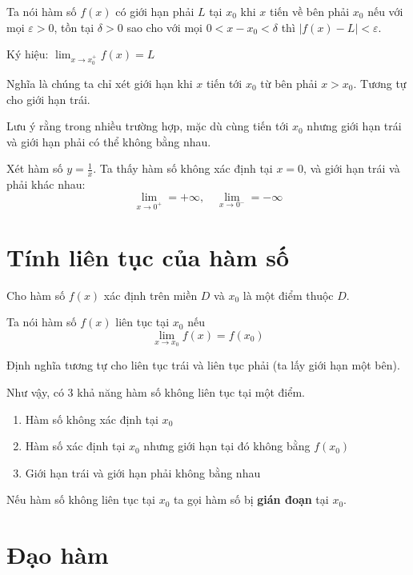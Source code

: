 \begin{definition}
    Ta nói hàm số $f(x)$ có giới hạn phải $L$ tại $x_0$ khi $x$ tiến về bên phải $x_0$
    nếu với mọi $\varepsilon > 0$, tồn tại $\delta > 0$ sao cho với mọi $0 < x - x_0 < \delta$ 
    thì $|f(x) - L| < \varepsilon$.

    Ký hiệu: $\displaystyle{\lim_{x \to x_0^+} f(x) = L}$
\end{definition}

Nghĩa là chúng ta chỉ xét giới hạn khi $x$ tiến tới $x_0$ từ bên phải $x > x_0$.
Tương tự cho giới hạn trái.

Lưu ý rằng trong nhiều trường hợp, mặc dù cùng tiến tới $x_0$ nhưng
giới hạn trái và giới hạn phải có thể không bằng nhau.

\begin{example}
    Xét hàm số $y = \frac{1}{x}$. Ta thấy hàm số không xác định
    tại $x = 0$, và giới hạn trái và phải khác nhau:
    \[\lim_{x \to 0^+} = +\infty, \quad \lim_{x \to 0^-} = -\infty\]
\end{example}

\section{Tính liên tục của hàm số}

Cho hàm số $f(x)$ xác định trên miền $D$ và $x_0$ là một điểm thuộc $D$.

\begin{definition}
    Ta nói hàm số $f(x)$ liên tục tại $x_0$ nếu
    \[\lim_{x \to x_0} f(x) = f(x_0)\]
\end{definition}

Định nghĩa tương tự cho liên tục trái và liên tục phải (ta lấy giới hạn một bên).

Như vậy, có 3 khả năng hàm số không liên tục tại một điểm.

\begin{enumerate}[noitemsep]
    \item Hàm số không xác định tại $x_0$
    \item Hàm số xác định tại $x_0$ nhưng giới hạn tại đó không bằng $f(x_0)$
    \item Giới hạn trái và giới hạn phải không bằng nhau
\end{enumerate}

Nếu hàm số không liên tục tại $x_0$ ta gọi hàm số bị \textbf{gián đoạn} tại $x_0$.

\section{Đạo hàm}


